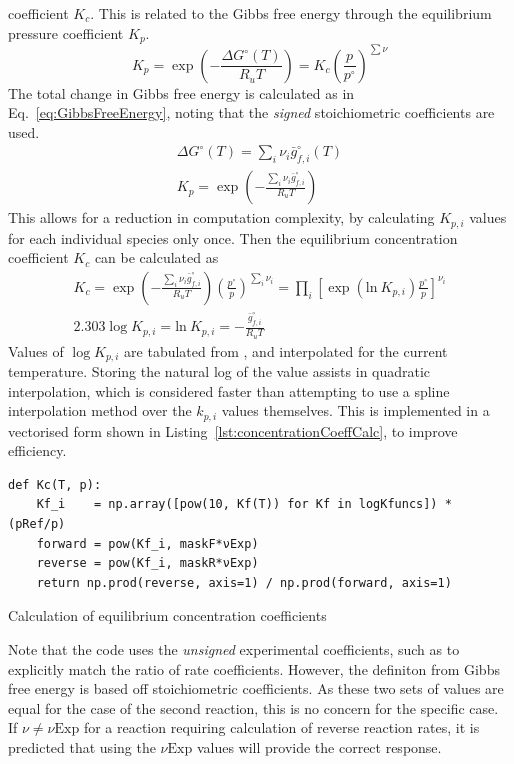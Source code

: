 \documentclass[a4paper]{article}
\begin{document}
coefficient \(K_c\). This is related to the Gibbs free energy through the
equilibrium pressure coefficient \(K_p\).
\begin{equation}
	\label{eq:equilibriumConstants}
	K_p = \exp \left( -\frac{\Delta G^{\circ}(T)}{R_u T} \right)
	= K_c \left( \frac{p}{p^{\circ}} \right)^{\sum \nu}
\end{equation}
The total change in Gibbs free energy is calculated as in
Eq.~\ref{eq:GibbsFreeEnergy}, noting that the \textit{signed} stoichiometric
coefficients are used.
\begin{gather}
	\label{eq:GibbsFreeEnergy}
	\Delta G^\circ (T) = \sum_i \nu_i \bar{g}_{f,i}^{\circ}(T) \\
	K_p = \exp \left( -\frac{
		\sum_i \nu_i \bar{g}_{f,i}^\circ
	}{R_u T} \right)
\end{gather}
This allows for a reduction in computation complexity, by calculating
\(K_{p,i}\) values for each individual species only once. Then the equilibrium
concentration coefficient \(K_c\) can be calculated as
\begin{gather}
	\label{eq:concentrationCoeffCalc}
	K_c = \exp \left( -\frac{
		\sum_i \nu_i \bar{g}_{f,i}^\circ
	}{R_u T} \right)
	\left( \frac{p^{\circ}}{p} \right)^{\sum_i \nu_i}
	= \prod_i \left[
		\exp \left( \text{ln}\ K_{p,i} \right)
		\frac{p^{\circ}}{p}
	\right]^{\nu_i} \\
	2.303 \log K_{p,i} = \text{ln}\ K_{p,i} = -\frac{\bar{g}_{f,i}^\circ}{R_u T}
\end{gather}
Values of \(\log K_{p,i}\) are tabulated from \cite{NIST}, and interpolated for
the current temperature. Storing the natural log of the value assists in
quadratic interpolation, which is considered faster than attempting to use a
spline interpolation method over the \(k_{p,i}\) values themselves. This is
implemented in a vectorised form shown in
Listing~\ref{lst:concentrationCoeffCalc}, to improve efficiency.
\begin{listing}[H]
	\centering
	\begin{minipage}{\linewidth}
		\begin{verbatim}
def Kc(T, p):
	Kf_i    = np.array([pow(10, Kf(T)) for Kf in logKfuncs]) * (pRef/p)
	forward = pow(Kf_i, maskF*νExp)
    reverse = pow(Kf_i, maskR*νExp)
    return np.prod(reverse, axis=1) / np.prod(forward, axis=1)
		\end{verbatim}
	\end{minipage}
	\caption{Calculation of equilibrium concentration coefficients}
	\label{lst:concentrationCoeffCalc}
\end{listing}
Note that the code uses the \textit{unsigned} experimental coefficients, such as
to explicitly match the ratio of rate coefficients. However, the definiton from
Gibbs free energy is based off stoichiometric coefficients. As these two sets of
values are equal for the case of the second reaction, this is no concern for the
specific case. If \(\nu \neq \nu\text{Exp}\) for a reaction requiring
calculation of reverse reaction rates, it is predicted that using the
\(\nu\text{Exp}\) values will provide the correct response.
\end{document}
